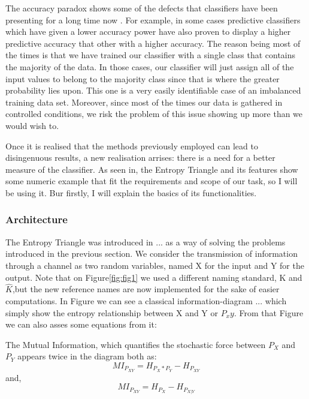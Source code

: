The accuracy paradox shows some of the defects that classifiers have been presenting for a long time now . For example, in some cases predictive classifiers which have given a lower accuracy power have also proven to display a higher predictive accuracy that other with a higher accuracy. The reason being most of the times is that we have trained our classifier with a single class that contains the majority of the data. In those cases, our classifier will just assign all of the input values to belong to the majority class since that is where the greater probability lies upon. This one is a very easily identifiable case of an imbalanced training data set. Moreover, since most of the times our data is gathered in controlled conditions, we risk the problem of this issue showing up more than we would wish to.\par

Once it is realised that the methods previously employed can lead to disingenuous results, a new realisation arrises: there is a need for a better measure of the classifier. As seen in, the Entropy Triangle and its features show some numeric example that fit the requirements and scope of our task, so I will be using it. Bur firstly, I will explain the basics of its functionalities.\par

\subsubsection{Architecture}

The Entropy Triangle was introduced in ... as a way of solving the problems introduced in the previous section. We consider the transmission of information through a channel as two random variables, named X for the input and Y for the output. Note that on Figure\ref{fig:fig1} we used a different naming standard, K and $\hat{K}$,but the new reference names are now implemented for the sake of easier computations. In Figure we can see a classical information-diagram ... which simply show the entropy relationship between X and Y or $P_xy$. From that Figure we can also asses some equations from it:\par

The Mutual Information, which quantifies the stochastic force between $P_X$ and $P_Y$ appears twice in the diagram both as:
\begin{equation}\label{eq:mutual_information_1}
MI_{P_{XY}} = H_{P_X * P_Y} - H_{P_{XY}}
\end{equation}
and,
\begin{equation}\label{eq:mutual_information_2}
MI_{P_{XY}} = H_{P_X} - H_{P_{X|Y}}
\end{equation}

